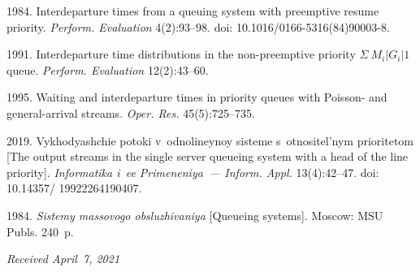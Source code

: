   \begin{multicols}{2}

\renewcommand{\bibname}{\protect\rmfamily References}

{\small\frenchspacing
 {%
 \begin{thebibliography}{9}
 
\vspace*{-4pt}
 
 1984. Interdeparture times from a queuing system with preemptive resume priority. 
\textit{Perform. Evaluation} 4(2):93--98.
doi: 10.1016/0166-5316(84)90003-8.

\vspace*{-1pt}

 1991. Interdeparture time distributions in the non-preemptive priority 
$\Sigma\ M_i|G_i|1$ queue. \textit{Perform. Evaluation} 12(2):43--60.

\vspace*{-1pt}

 
 1995. Waiting and interdeparture times in priority queues with Poisson-
 and general-arrival streams. \textit{Oper. Res.} 45(5):725--735.


\columnbreak


 2019. Vykhodyashchie potoki 
v~odnolineynoy sisteme s~otnositel'nym prioritetom [The output streams in the single server 
queueing system with a head of the line priority]. \textit{Informatika i~ee Primeneniya~--- 
Inform. Appl.} 13(4):42--47.
 doi: 10.14357/ 19922264190407.
 
 \vspace*{9pt}

1984. \textit{Sistemy massovogo obsluzhivaniya } [Queueing systems]. 
Moscow: MSU Publs. 240~p.

\end{thebibliography}

 }
 }

\end{multicols}

\vspace*{-3pt}

  \hfill{\small\textit{Received April~7, 2021}}


